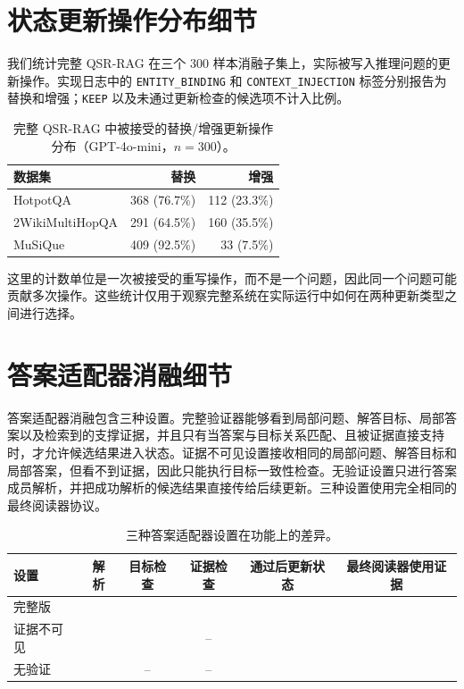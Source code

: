 \documentclass[11pt]{article}
\begin{document}
	\section{状态更新操作分布细节}
	\label{app:rewrite-behavior}

	我们统计完整 QSR-RAG 在三个 300 样本消融子集上，实际被写入推理问题的更新操作。实现日志中的 \texttt{ENTITY\_BINDING} 和 \texttt{CONTEXT\_INJECTION} 标签分别报告为替换和增强；\texttt{KEEP} 以及未通过更新检查的候选项不计入比例。

	\begin{table}[t]
		\centering
		\caption{完整 QSR-RAG 中被接受的替换/增强更新操作分布（GPT-4o-mini，$n=300$）。}
		\label{tab:rewrite-behavior}
		\small
		\setlength{\tabcolsep}{4.2pt}
		\begin{tabular}{lrr}
			\toprule
			数据集 & 替换 & 增强 \\
			\midrule
			HotpotQA & 368 (76.7\%) & 112 (23.3\%) \\
			2WikiMultiHopQA & 291 (64.5\%) & 160 (35.5\%) \\
			MuSiQue & 409 (92.5\%) & 33 (7.5\%) \\
			\bottomrule
		\end{tabular}
	\end{table}

	这里的计数单位是一次被接受的重写操作，而不是一个问题，因此同一个问题可能贡献多次操作。这些统计仅用于观察完整系统在实际运行中如何在两种更新类型之间进行选择。

	\section{答案适配器消融细节}
	\label{app:adapter-details}

	答案适配器消融包含三种设置。完整验证器能够看到局部问题、解答目标、局部答案以及检索到的支撑证据，并且只有当答案与目标关系匹配、且被证据直接支持时，才允许候选结果进入状态。证据不可见设置接收相同的局部问题、解答目标和局部答案，但看不到证据，因此只能执行目标一致性检查。无验证设置只进行答案成员解析，并把成功解析的候选结果直接传给后续更新。三种设置使用完全相同的最终阅读器协议。

	\begin{table}[t]
		\centering
		\caption{三种答案适配器设置在功能上的差异。}
		\label{tab:adapter-components}
		\small
		\begin{tabular}{lccccc}
			\toprule
			设置 & 解析 & 目标检查 & 证据检查 & 通过后更新状态 & 最终阅读器使用证据\\
			\midrule
			完整版 & \checkmark & \checkmark & \checkmark & \checkmark & \checkmark\\
			证据不可见 & \checkmark & \checkmark & -- & \checkmark & \checkmark\\
			无验证 & \checkmark & -- & -- & \checkmark & \checkmark\\
			\bottomrule
		\end{tabular}
	\end{table}
\end{document}

